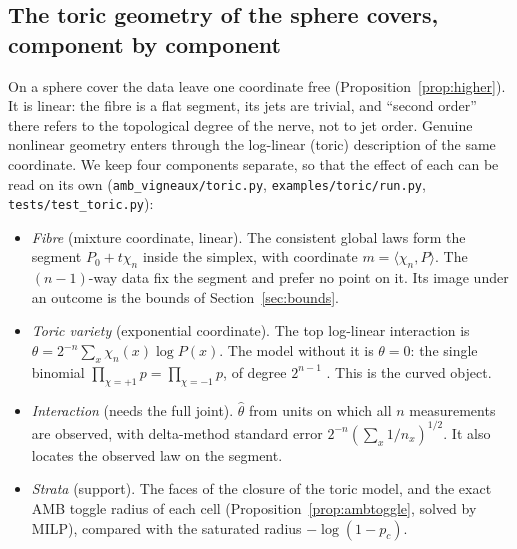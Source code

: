 \documentclass[11pt]{article}
\theoremstyle{definition}
\theoremstyle{remark}
\begin{document}
\subsection{The toric geometry of the sphere covers, component by component}\label{sec:toricsphere}
On a sphere cover the data leave one coordinate free (Proposition~\ref{prop:higher}). It is linear: the fibre is a flat segment, its jets are trivial, and ``second order'' there refers to the topological degree of the nerve, not to jet order. Genuine nonlinear geometry enters through the log-linear (toric) description of the same coordinate. We keep four components separate, so that the effect of each can be read on its own (\texttt{amb\_vigneaux/toric.py}, \texttt{examples/toric/run.py}, \texttt{tests/test\_toric.py}):
\begin{itemize}
  \item[\textbf{[F]}] \emph{Fibre} (mixture coordinate, linear). The consistent global laws form the segment $P_0+t\chi_n$ inside the simplex, with coordinate $m=\langle\chi_n,P\rangle$. The $(n-1)$-way data fix the segment and prefer no point on it. Its image under an outcome is the bounds of Section~\ref{sec:bounds}.
  \item[\textbf{[T]}] \emph{Toric variety} (exponential coordinate). The top log-linear interaction is $\theta=2^{-n}\sum_x\chi_n(x)\log P(x)$. The model without it is $\theta=0$: the single binomial $\prod_{\chi=+1}p=\prod_{\chi=-1}p$, of degree $2^{n-1}$ \cite{gms06}. This is the curved object.
  \item[\textbf{[I]}] \emph{Interaction} (needs the full joint). $\hat\theta$ from units on which all $n$ measurements are observed, with delta-method standard error $2^{-n}(\sum_x1/n_x)^{1/2}$. It also locates the observed law on the segment.
  \item[\textbf{[S]}] \emph{Strata} (support). The faces of the closure of the toric model, and the exact AMB toggle radius of each cell (Proposition~\ref{prop:ambtoggle}, solved by MILP), compared with the saturated radius $-\log(1-p_c)$.
\end{itemize}
\end{document}
